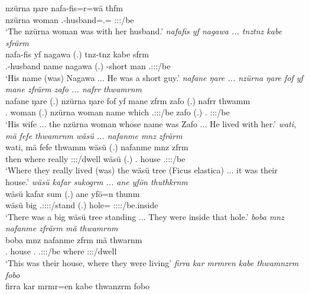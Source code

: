 \begin{exe}
	\gll nzürna ŋare nafa-fis=r=wä thfm\\
	nzürna woman \Third.\Poss-husband=\Assoc.\Du={\Emph} \Stdu:\Sbj:\Pst:\Dur/be\\
	\trans `The nzürna woman was with her husband.'
	\emph{nafafis yf nagawa ... tnztnz kabe sfrärm}\\
	\gll nafa-fis yf nagawa (.) tnz-tnz kabe sfrm\\
	\Third.\Poss-husband name nagawa (.) \Redup-short man \Tsg.\Masc:\Sbj:\Pst:\Dur/be\\
	\trans `His name (was) Nagawa ... He was a short guy.'
	\emph{nafane ŋare ... nzürna ŋare fof yf mane zfrärm zafo ... nafrr thwamrnm}\\
	\gll nafane ŋare (.) nzürna ŋare fof yf mane zfrm zafo (.) nafrr thwamm\\
	\Tsg.{\Poss} woman (.) nzürna woman {\Emph} name which \Tsg.\F:\Sbj:\Pst:\Dur/be zafo (.) \Tdu.{\Assoc} \Stdu:\Sbj:\Pst:\Dur/be\\
	\trans `His wife ... the nzürna woman whose name was Zafo ... He lived with her.'
	\emph{wati, mä fefe thwamrnm wäsü ... nafanme mnz zfrärm}\\
	\gll wati, mä fefe thwamm wäsü (.) nafanme mnz zfrm\\
	then where really \Stdu:\Sbj:\Pst:\Dur/dwell wäsü (.) \Tnsg.{\Poss} house \Tsg.\F:\Sbj:\Pst:\Dur/be\\
	\trans `Where they really lived (was) the wäsü tree (Ficus elastica) ... it was their house.'
	\emph{wäsü kafar sukogrm ... ane yfön thuthkrnm}\\
	\gll wäsü kafar sum (.) ane yfö=n thunm\\
	wäsü big \Tsg.\Masc:\Sbj:\Pst:\Dur:\Stat/stand (.) {\Dem} hole={\Loc} \Stdu:\Sbj:\Pst:\Dur:\Stat/be.inside\\
	\trans `There was a big wäsü tree standing ... They were inside that hole.'
	\emph{boba mnz nafanme zfrärm mä thwamrnm}\\
	\gll boba mnz nafanme zfrm mä thwarnm\\
	\Med.{\Abl} house \Tnsg.{\Poss} \Tsg.\F:\Sbj:\Pst:\Dur/be where \Stdu:\Sbj:\Pst:\Dur/dwell\\
	\trans `This was their house, where they were living'
	\emph{firra kar mrmren kabe thwamnzrm fobo}\\
	\gll firra kar mrmr=en kabe thwanzrm fobo\\

\end{exe}

